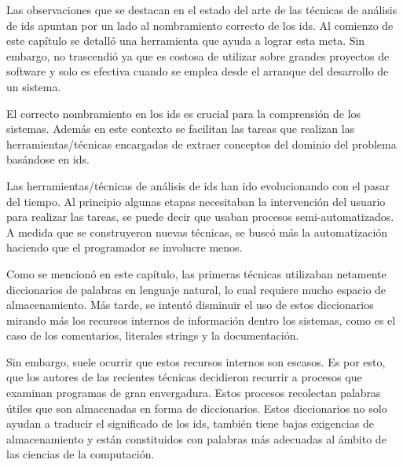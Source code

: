\documentclass[a4paper,12pt]{report}
\begin{document}
Las observaciones que se destacan en el estado del arte de las técnicas de análisis de ids apuntan por un lado al nombramiento correcto de los ids. Al comienzo de este capítulo se detalló una herramienta que ayuda a lograr esta meta. Sin embargo, no trascendió ya que es costosa de utilizar sobre grandes proyectos de software y solo es efectiva cuando se emplea desde el arranque del desarrollo de un sistema.

El correcto nombramiento en los ids es crucial para la comprensión de los sistemas. Además en este contexto se facilitan las tareas que realizan las herramientas/técnicas encargadas de extraer conceptos del dominio del problema basándose en ids. 

Las herramientas/técnicas de análisis de ids han ido evolucionando con el pasar del tiempo. Al principio algunas etapas necesitaban la intervención del usuario para realizar las tareas, se puede decir que usaban procesos semi-automatizados. A medida que se construyeron nuevas técnicas, se buscó más la automatización haciendo que el programador se involucre menos.

Como se mencionó en este capítulo, las primeras técnicas utilizaban netamente diccionarios de palabras en lenguaje natural, lo cual requiere mucho espacio de almacenamiento. Más tarde, se intentó disminuir el uso de estos diccionarios mirando más los recursos internos de información dentro los sistemas, como es el caso de los comentarios, literales strings y la documentación.

Sin embargo, suele ocurrir que estos recursos internos son escasos. Es por esto, que los autores de las recientes técnicas decidieron recurrir a procesos que examinan programas de gran envergadura. Estos procesos recolectan palabras útiles que son almacenadas en forma de diccionarios. Estos diccionarios no solo ayudan a traducir el significado de los ids, también tiene bajas exigencias de almacenamiento y están constituidos con palabras más adecuadas al ámbito de las ciencias de la computación.



\end{document}
